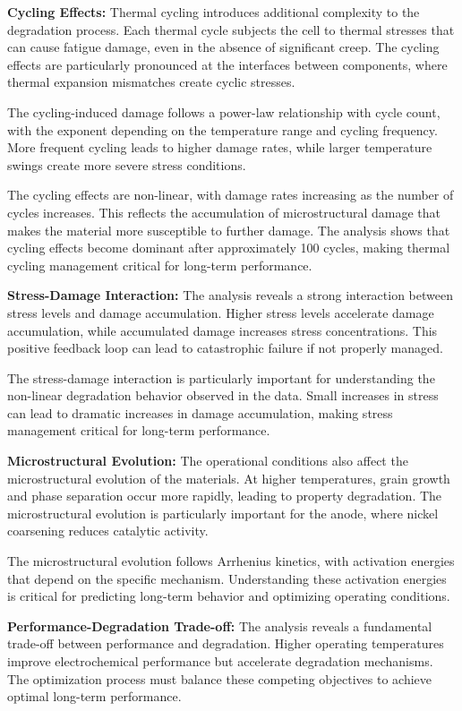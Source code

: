 \documentclass[conference]{IEEEtran}
\begin{document}
\textbf{Cycling Effects:} Thermal cycling introduces additional complexity to the degradation process. Each thermal cycle subjects the cell to thermal stresses that can cause fatigue damage, even in the absence of significant creep. The cycling effects are particularly pronounced at the interfaces between components, where thermal expansion mismatches create cyclic stresses.

The cycling-induced damage follows a power-law relationship with cycle count, with the exponent depending on the temperature range and cycling frequency. More frequent cycling leads to higher damage rates, while larger temperature swings create more severe stress conditions.

The cycling effects are non-linear, with damage rates increasing as the number of cycles increases. This reflects the accumulation of microstructural damage that makes the material more susceptible to further damage. The analysis shows that cycling effects become dominant after approximately 100 cycles, making thermal cycling management critical for long-term performance.

\textbf{Stress-Damage Interaction:} The analysis reveals a strong interaction between stress levels and damage accumulation. Higher stress levels accelerate damage accumulation, while accumulated damage increases stress concentrations. This positive feedback loop can lead to catastrophic failure if not properly managed.

The stress-damage interaction is particularly important for understanding the non-linear degradation behavior observed in the data. Small increases in stress can lead to dramatic increases in damage accumulation, making stress management critical for long-term performance.

\textbf{Microstructural Evolution:} The operational conditions also affect the microstructural evolution of the materials. At higher temperatures, grain growth and phase separation occur more rapidly, leading to property degradation. The microstructural evolution is particularly important for the anode, where nickel coarsening reduces catalytic activity.

The microstructural evolution follows Arrhenius kinetics, with activation energies that depend on the specific mechanism. Understanding these activation energies is critical for predicting long-term behavior and optimizing operating conditions.

\textbf{Performance-Degradation Trade-off:} The analysis reveals a fundamental trade-off between performance and degradation. Higher operating temperatures improve electrochemical performance but accelerate degradation mechanisms. The optimization process must balance these competing objectives to achieve optimal long-term performance.
\end{document}

